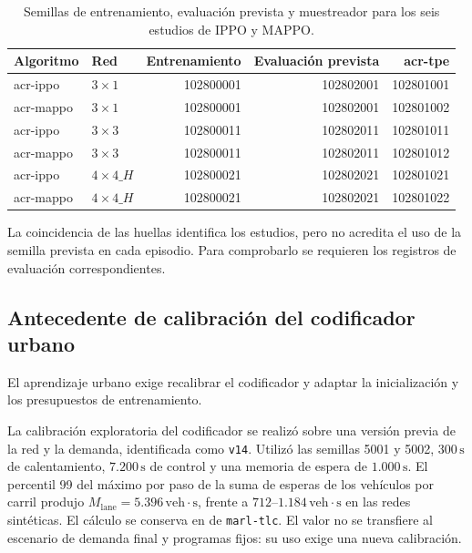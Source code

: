 \begin{table}[H]\centering\small
\caption{Semillas de entrenamiento, evaluación prevista y muestreador para los seis estudios de IPPO y MAPPO.}\label{tab:semillas_estudios}
\begin{tabular}{@{}llrrr@{}}\hline
\rowcolor{catAzulCielo!25}
Algoritmo & Red & Entrenamiento & Evaluación prevista & \acrshort{acr-tpe} \\\hline
\acrshort{acr-ippo} & $3\times1$ & 102800001 & 102802001 & 102801001 \\
\acrshort{acr-mappo} & $3\times1$ & 102800001 & 102802001 & 102801002 \\
\acrshort{acr-ippo} & $3\times3$ & 102800011 & 102802011 & 102801011 \\
\acrshort{acr-mappo} & $3\times3$ & 102800011 & 102802011 & 102801012 \\
\acrshort{acr-ippo} & $4\times4\_H$ & 102800021 & 102802021 & 102801021 \\
\acrshort{acr-mappo} & $4\times4\_H$ & 102800021 & 102802021 & 102801022 \\
\hline
\end{tabular}\end{table}

La coincidencia de las huellas identifica los estudios, pero no acredita el uso de la semilla prevista en cada episodio. Para comprobarlo se requieren los registros de evaluación correspondientes.

\subsection{Antecedente de calibración del codificador urbano}
\label{subsec:protocolo_urbano_mendoza}

El aprendizaje urbano exige recalibrar el codificador y adaptar la inicialización y los presupuestos de entrenamiento.

La calibración exploratoria del codificador se realizó sobre una versión previa de la red y la demanda, identificada como \texttt{v14}. Utilizó las semillas 5001 y 5002, $300\,\text{s}$ de calentamiento, $7.200\,\text{s}$ de control y una memoria de espera de $1.000\,\text{s}$. El percentil 99 del máximo por paso de la suma de esperas de los vehículos por carril produjo $M_{\mathrm{lane}}=5.396\,\text{veh}\cdot\text{s}$, frente a $712$--$1.184\,\text{veh}\cdot\text{s}$ en las redes sintéticas. El cálculo se conserva en  de \texttt{marl-tlc}. El valor no se transfiere al escenario de demanda final y programas fijos: su uso exige una nueva calibración.

